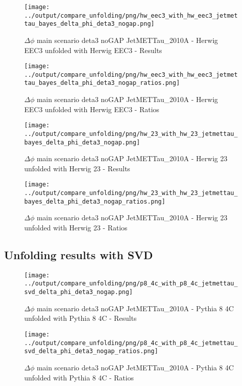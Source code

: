 \documentclass[11pt]{book}
\begin{document}
\begin{figure}[ht]
\centering
\texttt{[image: ../output/compare\_unfolding/png/hw\_eec3\_with\_hw\_eec3\_jetmettau\_bayes\_delta\_phi\_deta3\_nogap.png]}
\caption{$\Delta\phi$ main scenario deta3 noGAP JetMETTau\_2010A - Herwig EEC3 unfolded with Herwig EEC3 - Results}
\label{hw_eec3_hw_eec3_jetmettau_bayes_delta_phi_deta3_nogap_a}
\end{figure}

\begin{figure}[ht]
\centering
\texttt{[image: ../output/compare\_unfolding/png/hw\_eec3\_with\_hw\_eec3\_jetmettau\_bayes\_delta\_phi\_deta3\_nogap\_ratios.png]}
\caption{$\Delta\phi$ main scenario deta3 noGAP JetMETTau\_2010A - Herwig EEC3 unfolded with Herwig EEC3 - Ratios}
\label{hw_eec3_hw_eec3_jetmettau_bayes_delta_phi_deta3_nogap_b}
\end{figure}

\begin{figure}[ht]
\centering
\texttt{[image: ../output/compare\_unfolding/png/hw\_23\_with\_hw\_23\_jetmettau\_bayes\_delta\_phi\_deta3\_nogap.png]}
\caption{$\Delta\phi$ main scenario deta3 noGAP JetMETTau\_2010A - Herwig 23 unfolded with Herwig 23 - Results}
\label{hw_23_hw_23_jetmettau_bayes_delta_phi_deta3_nogap_a}
\end{figure}

\begin{figure}[ht]
\centering
\texttt{[image: ../output/compare\_unfolding/png/hw\_23\_with\_hw\_23\_jetmettau\_bayes\_delta\_phi\_deta3\_nogap\_ratios.png]}
\caption{$\Delta\phi$ main scenario deta3 noGAP JetMETTau\_2010A - Herwig 23 unfolded with Herwig 23 - Ratios}
\label{hw_23_hw_23_jetmettau_bayes_delta_phi_deta3_nogap_b}
\end{figure}

\clearpage
\subsection{Unfolding results with SVD}

\begin{figure}[ht]
\centering
\texttt{[image: ../output/compare\_unfolding/png/p8\_4c\_with\_p8\_4c\_jetmettau\_svd\_delta\_phi\_deta3\_nogap.png]}
\caption{$\Delta\phi$ main scenario deta3 noGAP JetMETTau\_2010A - Pythia 8 4C unfolded with Pythia 8 4C - Results}
\label{p8_p8_jetmettau_svd_delta_phi_deta3_nogap_a}
\end{figure}

\begin{figure}[ht]
\centering
\texttt{[image: ../output/compare\_unfolding/png/p8\_4c\_with\_p8\_4c\_jetmettau\_svd\_delta\_phi\_deta3\_nogap\_ratios.png]}
\caption{$\Delta\phi$ main scenario deta3 noGAP JetMETTau\_2010A - Pythia 8 4C unfolded with Pythia 8 4C - Ratios}
\label{p8_p8_jetmettau_svd_delta_phi_deta3_nogap_b}
\end{figure}
\end{document}
